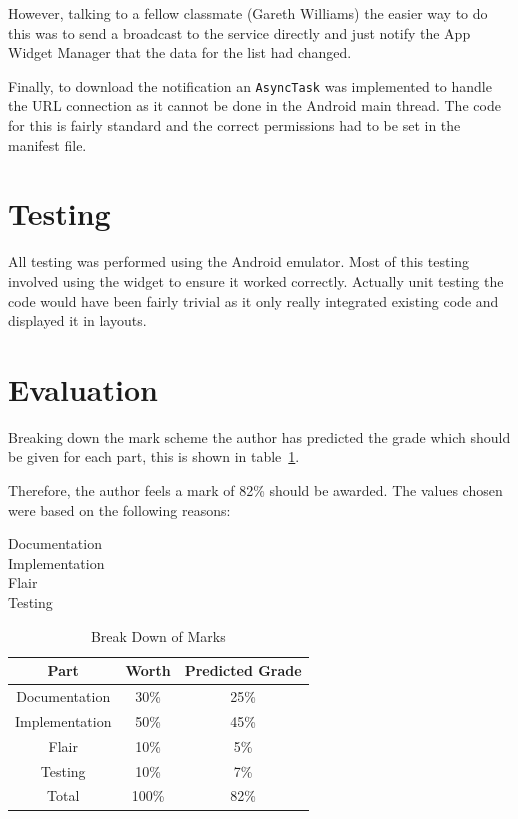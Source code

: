 \documentclass[11pt, a4paper]{article}
\begin{document}
However, talking to a fellow classmate (Gareth Williams) the easier way to do
this was to send a broadcast to the service directly and just notify the App
Widget Manager that the data for the list had changed.

Finally, to download the notification an \texttt{AsyncTask} was implemented to
handle the URL connection as it cannot be done in the Android main thread. The
code for this is fairly standard and the correct permissions had to be set in
the manifest file.


\section{Testing}
All testing was performed using the Android emulator. Most of this testing
involved using the widget to ensure it worked correctly. Actually unit testing
the code would have been fairly trivial as it only really integrated existing
code and displayed it in layouts.


\section{Evaluation}


Breaking down the mark scheme the author has predicted the grade which should 
be given for each part, this is shown in table~\ref{tab:marks}.

Therefore, the author feels a mark of 82\% should be awarded. The values chosen 
were based on the following reasons:

\begin{description}
\item[Documentation] 
\item[Implementation] 
\item[Flair] 
\item[Testing] 
\end{description}

\begin{table}[h]
\centering
\begin{tabular}{|c|c|c|}\hline
\textbf{Part} & \textbf{Worth} & \textbf{Predicted Grade} \\ \hline
Documentation & 30\% & 25\% \\ 
Implementation & 50\% & 45\% \\ 
Flair & 10\% & 5\% \\ 
Testing & 10\% & 7\% \\ \hline
Total & 100\% & 82\% \\ \hline
\end{tabular}
\caption{Break Down of Marks}\label{tab:marks}
\end{table}

\newpage



\end{document}
